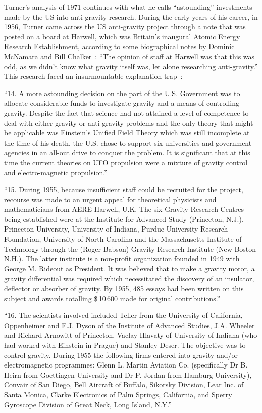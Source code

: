 Turner's analysis of 1971 continues with what he calls ``astounding'' investments made by the US into anti-gravity research.
During the early years of his career, in 1956, Turner came across the US anti-gravity project through a note that was posted on a board at Harwell,
which was Britain's inaugural Atomic Energy Research Establishment, according to some biographical notes by   Dominic McNamara and Bill Chalker~\cite{Turner-bio-Chalker}:
``The opinion of staff at Harwell was that this was odd, as we didn't know what gravity itself was, let alone researching anti-gravity.''
This research faced an insurmountable explanation trap~\cite{TurnerAustralia1971}:
\begin{svgraybox}
``14. A more astounding decision on the part of the U.S. Government
was to allocate considerable funds to investigate gravity and a
means of controlling gravity. Despite the fact that science had
not attained a level of competence to deal with either gravity or
anti-gravity problems and the only theory that might be applicable
was Einstein's Unified Field Theory which was still incomplete at the
time of his death, the U.S. chose to support six universities and
government agencies in an all-out drive to conquer the problem.
It is significant that at this time the current theories on UFO
propulsion were a mixture of gravity control and electro-magnetic
propulsion.''

``15. During 1955, because insufficient staff could be recruited
for the project, recourse was made to an urgent appeal for theoretical
physicists and mathematicians from AERE Harwell, U.K. The six
Gravity Research Centres being established were at the Institute for
Advanced Study (Princeton, N.J.), Princeton University, University
of Indiana, Purdue University Research Foundation, University of
North Carolina and the Massachusetts Institute of Technology
through the (Roger Babson) Gravity Research Institute (New Boston
N.H.). The latter institute is a non-profit organization founded
in 1949 with George M. Rideout as President. It was believed that
to make a gravity motor, a gravity differential was required which
necessitated the discovery of an insulator, deflector or absorber
of gravity. By 1955, 485 essays had been written on this subject
and awards totalling {\$}\,10\,600 made for original contributions.''

``16. The scientists involved included Teller from the University
of California, Oppenheimer and F.J. Dyson of the Institute of
Advanced Studies, J.A. Wheeler and Richard Arnowitt of Princeton,
Vaclay Hlavaty of University of Indiana (who had worked with
Einstein in Prague) and Stanley Deser. The objective was to control
gravity. During 1955 the following firms entered into gravity
and/or electromagnetic programmes: Glenn L. Martin Aviation Co.
(specifically Dr B. Heirn from Goettingen University and Dr P.
Jordan from Hamburg University), Convair of San Diego, Bell Aircraft
of Buffalo, Sikorsky Division, Lear Inc. of Santa Monica, Clarke
Electronics of Palm Springs, California, and Sperry Gyroscope
Division of Great Neck, Long Island, N.Y.''


\end{svgraybox}
